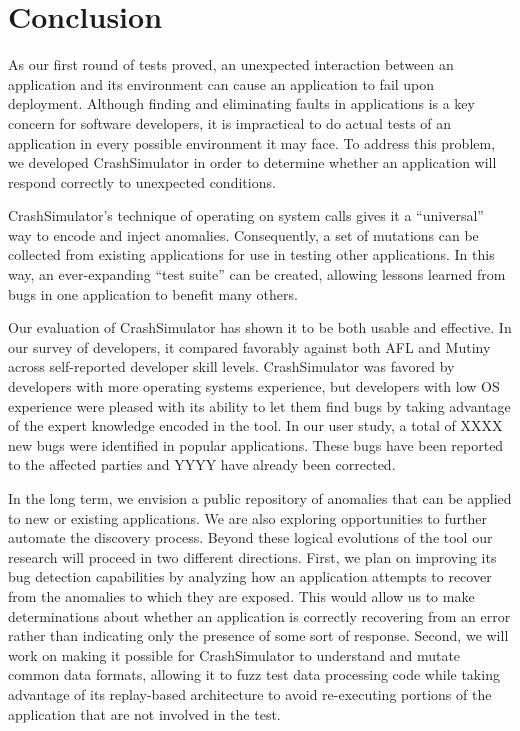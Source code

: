 \section{Conclusion}
\label{SEC:conclusion}

As our first round of tests proved, an unexpected interaction between an
application and its environment can cause
an application to fail upon deployment.
Although finding and eliminating
faults in applications is a key concern for software developers, it is
impractical to do actual tests of an application in every possible
environment it may face.
To address this problem, we developed CrashSimulator
in order to determine whether an application will
respond correctly to unexpected conditions.

CrashSimulator's
technique of
operating on system calls gives it a ``universal'' way to
encode and inject anomalies. Consequently, a set of mutations can be
collected from existing applications for use in testing other
applications. In this way, an ever-expanding ``test suite'' can be
created, allowing lessons learned from bugs in one application to benefit
many others.

Our evaluation of CrashSimulator has shown it to be both usable and
effective.  In our survey of developers, it compared favorably
against both AFL and Mutiny across self-reported developer skill levels.
CrashSimulator was favored by developers with more operating
systems experience, but developers with low OS experience were pleased
with its ability to let them find bugs by taking advantage of
the expert knowledge encoded in the tool.
In our user study, a total of
XXXX new bugs were identified in popular applications.
These bugs have been reported to the
affected parties and YYYY have already been corrected.

In the long term, we
envision a public repository of anomalies 
that can be applied to new or existing applications.
We are also exploring
opportunities to further automate the discovery process.
Beyond these logical
evolutions of the tool our research will proceed in
two different directions.  First, we plan on improving
its bug detection capabilities by analyzing how an
application attempts
to recover from the anomalies to which they are exposed.  This would allow
us to make determinations about whether
an application is correctly recovering
from an error rather than indicating only
the presence of some sort of response.
Second, we will work on making it possible for CrashSimulator to
understand and mutate common data formats, allowing it
to fuzz test data processing code while taking advantage of its
replay-based architecture to avoid re-executing portions of the application
that are not involved in the test.
